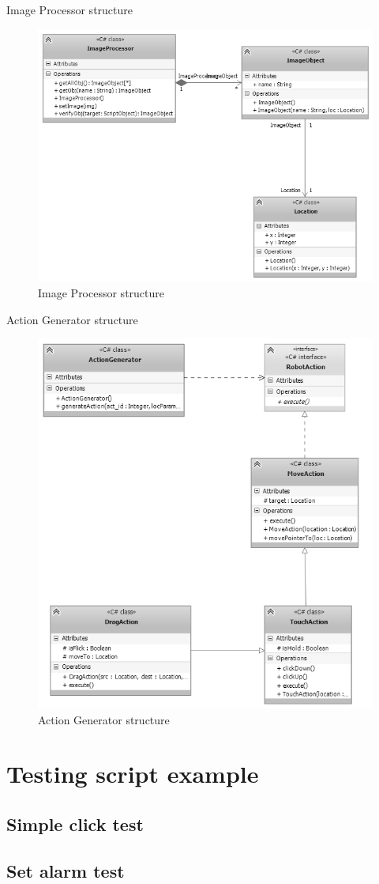Image Processor structure
	\begin{figure}[H]
		\centering
		\includegraphics[scale=0.75]{Chapters/Fig/img_processor.png}
		\caption{Image Processor structure}
		\label{fig:img_processor}
	\end{figure}

Action Generator structure
	\begin{figure}[H]
		\centering
		\includegraphics[scale=0.75]{Chapters/Fig/act_gen.png}
		\caption{Action Generator structure}
		\label{fig:act_gen}
	\end{figure}

\section{Testing script example}
\subsection{Simple click test}

\subsection{Set alarm test}
